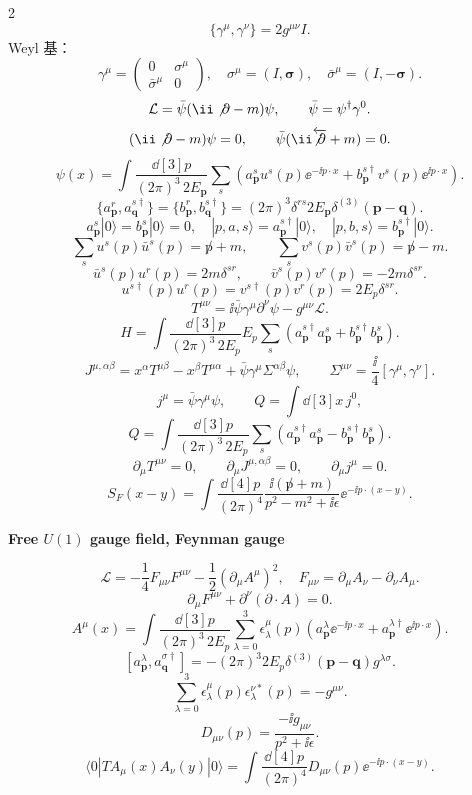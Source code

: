 \begin{multicols}{2}
\[
\{\gamma^\mu,\gamma^\nu\}=2g^{\mu\nu}I.
\]
Weyl 基：
\[
\gamma^\mu=\begin{pmatrix}0&\sigma^\mu\\\bar\sigma^\mu&0\end{pmatrix},
\quad
\sigma^\mu=(I,\boldsymbol\sigma),
\quad
\bar\sigma^\mu=(I,-\boldsymbol\sigma).
\]
\[
\mathcal L=\bar\psi(\ii\not\partial-m)\psi,
\qquad \bar\psi=\psi^\dagger\gamma^0.
\]
\[
(\ii\not\partial-m)\psi=0,
\qquad
\bar\psi(\ii\overleftarrow{\not\partial}+m)=0.
\]
\[
\psi(x)=\int\frac{\dd[3]{p}}{(2\pi)^3\,2E_{\mathbf p}}
\sum_s\left(a_{\mathbf p}^s u^s(p)\ee^{-\ii p\cdot x}
+b_{\mathbf p}^{s\dagger}v^s(p)\ee^{\ii p\cdot x}\right).
\]
\[
\{a_{\mathbf p}^r,a_{\mathbf q}^{s\dagger}\}
=\{b_{\mathbf p}^r,b_{\mathbf q}^{s\dagger}\}
=(2\pi)^3\delta^{rs}2E_{\mathbf p}\delta^{(3)}(\mathbf p-\mathbf q).
\]
\[
a_{\mathbf p}^s|0\rangle=b_{\mathbf p}^s|0\rangle=0,
\quad
|p,a,s\rangle=a_{\mathbf p}^{s\dagger}|0\rangle,
\quad
|p,b,s\rangle=b_{\mathbf p}^{s\dagger}|0\rangle.
\]
\[
\sum_su^s(p)\bar u^s(p)=\not p+m,
\qquad
\sum_sv^s(p)\bar v^s(p)=\not p-m.
\]
\[
\bar u^s(p)u^r(p)=2m\delta^{sr},
\qquad
\bar v^s(p)v^r(p)=-2m\delta^{sr}.
\]
\[
u^{s\dagger}(p)u^r(p)=v^{s\dagger}(p)v^r(p)=2E_p\delta^{sr}.
\]
\[
T^{\mu\nu}=\ii\bar\psi\gamma^\mu\partial^\nu\psi-g^{\mu\nu}\mathcal L.
\]
\[
H=\int\frac{\dd[3]{p}}{(2\pi)^3\,2E_p}E_p
\sum_s(a_{\mathbf p}^{s\dagger}a_{\mathbf p}^s+b_{\mathbf p}^{s\dagger}b_{\mathbf p}^s).
\]
\[
J^{\mu,\alpha\beta}=x^\alpha T^{\mu\beta}-x^\beta T^{\mu\alpha}
+\bar\psi\gamma^\mu\Sigma^{\alpha\beta}\psi,
\qquad
\Sigma^{\mu\nu}=\frac\ii4[\gamma^\mu,\gamma^\nu].
\]
\[
j^\mu=\bar\psi\gamma^\mu\psi,
\qquad Q=\int\dd[3]{x}\,j^0,
\]
\[
Q=\int\frac{\dd[3]{p}}{(2\pi)^3\,2E_p}\sum_s
\left(a_{\mathbf p}^{s\dagger}a_{\mathbf p}^s
-b_{\mathbf p}^{s\dagger}b_{\mathbf p}^s\right).
\]
\[
\partial_\mu T^{\mu\nu}=0,\qquad
\partial_\mu J^{\mu,\alpha\beta}=0,\qquad
\partial_\mu j^\mu=0.
\]
\[
S_F(x-y)=\int\frac{\dd[4]{p}}{(2\pi)^4}
\frac{\ii(\not p+m)}{p^2-m^2+\ii\epsilon}\ee^{-\ii p\cdot(x-y)}.
\]

\columnbreak
\textbf{Free $U(1)$ gauge field, Feynman gauge}

\[
\mathcal L=-\frac14F_{\mu\nu}F^{\mu\nu}-\frac12(\partial_\mu A^\mu)^2,
\quad
F_{\mu\nu}=\partial_\mu A_\nu-\partial_\nu A_\mu.
\]
\[
\partial_\mu F^{\mu\nu}+\partial^\nu(\partial\cdot A)=0.
\]
\[
A^\mu(x)=\int\frac{\dd[3]{p}}{(2\pi)^3\,2E_p}
\sum_{\lambda=0}^3\epsilon_\lambda^\mu(p)
\left(a_{\mathbf p}^\lambda\ee^{-\ii p\cdot x}+a_{\mathbf p}^{\lambda\dagger}\ee^{\ii p\cdot x}\right).
\]
\[
[a_{\mathbf p}^\lambda,a_{\mathbf q}^{\sigma\dagger}]
=-(2\pi)^3 2E_p\delta^{(3)}(\mathbf p-\mathbf q)g^{\lambda\sigma}.
\]
\[
\sum_{\lambda=0}^3\epsilon_\lambda^\mu(p)\epsilon_\lambda^{\nu*}(p)=-g^{\mu\nu}.
\]
\[
D_{\mu\nu}(p)=\frac{-\ii g_{\mu\nu}}{p^2+\ii\epsilon}.
\]
\[
\langle0|T A_\mu(x)A_\nu(y)|0\rangle
=\int\frac{\dd[4]{p}}{(2\pi)^4}D_{\mu\nu}(p)\ee^{-\ii p\cdot(x-y)}.
\]
\end{multicols}

